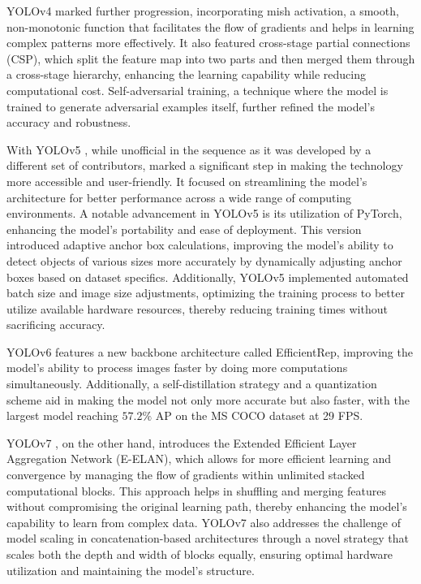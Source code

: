 YOLOv4 \cite{bochkovskiy2020yolov4} marked further progression, incorporating mish activation, a smooth, non-monotonic function that facilitates the flow of gradients and helps in learning complex patterns more effectively. It also featured cross-stage partial connections (CSP), which split the feature map into two parts and then merged them through a cross-stage hierarchy, enhancing the learning capability while reducing computational cost. Self-adversarial training, a technique where the model is trained to generate adversarial examples itself, further refined the model's accuracy and robustness.

With YOLOv5 \cite{Jocher2020YOLOv5}, while unofficial in the sequence as it was developed by a different set of contributors, marked a significant step in making the technology more accessible and user-friendly. It focused on streamlining the model's architecture for better performance across a wide range of computing environments. A notable advancement in YOLOv5 is its utilization of PyTorch, enhancing the model's portability and ease of deployment. This version introduced adaptive anchor box calculations, improving the model's ability to detect objects of various sizes more accurately by dynamically adjusting anchor boxes based on dataset specifics. Additionally, YOLOv5 implemented automated batch size and image size adjustments, optimizing the training process to better utilize available hardware resources, thereby reducing training times without sacrificing accuracy.

YOLOv6 \cite{li2022yolov6} features a new backbone architecture called EfficientRep, improving the model's ability to process images faster by doing more computations simultaneously. Additionally, a self-distillation strategy and a quantization scheme aid in making the model not only more accurate but also faster, with the largest model reaching $57.2\%$ AP on the MS COCO dataset at 29 FPS.

YOLOv7 \cite{wang2023yolov7}, on the other hand, introduces the Extended Efficient Layer Aggregation Network (E-ELAN), which allows for more efficient learning and convergence by managing the flow of gradients within unlimited stacked computational blocks. This approach helps in shuffling and merging features without compromising the original learning path, thereby enhancing the model's capability to learn from complex data. YOLOv7 also addresses the challenge of model scaling in concatenation-based architectures through a novel strategy that scales both the depth and width of blocks equally, ensuring optimal hardware utilization and maintaining the model's structure. 


